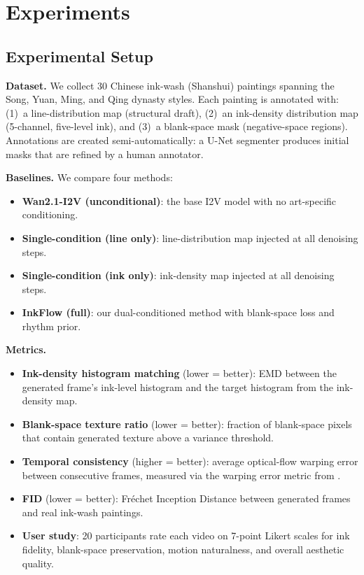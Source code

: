 \section{Experiments}
\label{sec:experiments}

\subsection{Experimental Setup}

\textbf{Dataset.} We collect 30 Chinese ink-wash (Shanshui)
paintings spanning the Song, Yuan, Ming, and Qing dynasty styles.
Each painting is annotated with: (1)~a line-distribution map
(structural draft), (2)~an ink-density distribution map (5-channel,
five-level ink), and (3)~a blank-space mask (negative-space
regions). Annotations are created semi-automatically: a U-Net
segmenter produces initial masks that are refined by a human
annotator.

\textbf{Baselines.} We compare four methods:
\begin{itemize}
    \item \textbf{Wan2.1-I2V (unconditional)}: the base I2V model
    with no art-specific conditioning.
    \item \textbf{Single-condition (line only)}: line-distribution
    map injected at all denoising steps.
    \item \textbf{Single-condition (ink only)}: ink-density map
    injected at all denoising steps.
    \item \textbf{InkFlow (full)}: our dual-conditioned method with
    blank-space loss and rhythm prior.
\end{itemize}

\textbf{Metrics.}
\begin{itemize}
    \item \textbf{Ink-density histogram matching} (lower = better):
    EMD between the generated frame's ink-level histogram and the
    target histogram from the ink-density map.
    \item \textbf{Blank-space texture ratio} (lower = better):
    fraction of blank-space pixels that contain generated texture
    above a variance threshold.
    \item \textbf{Temporal consistency} (higher = better): average
    optical-flow warping error between consecutive frames, measured
    via the warping error metric from \citet{lai2018video}.
    \item \textbf{FID} (lower = better): Fréchet Inception Distance
    between generated frames and real ink-wash paintings.
    \item \textbf{User study}: 20 participants rate each video on
    7-point Likert scales for ink fidelity, blank-space
    preservation, motion naturalness, and overall aesthetic quality.
\end{itemize}

